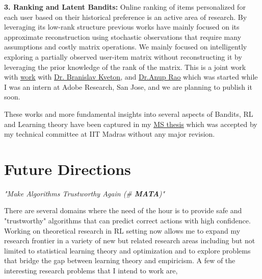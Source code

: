 \documentclass{article}
\begin{document}
\textbf{3. Ranking and Latent Bandits:} Online ranking of items personalized for each user based on their historical preference is an active area of research. By leveraging its low-rank structure previous works have mainly focused on its approximate reconstruction using stochastic observations that require many assumptions and costly matrix operations. We mainly focused on intelligently exploring a partially observed user-item matrix without reconstructing it by leveraging the prior knowledge of the rank of the matrix. This is a joint work with  \href{https://subhojyoti.github.io/pdf/paper.pdf}{\underline{\color{blue} work}} with \href{http://www.bkveton.com/}{\underline{\color{red}Dr. Branislav Kveton}}, and \href{https://sites.google.com/site/anupraob/}{\underline{\color{red}Dr.Anup Rao}} which was started while I was an intern at Adobe Research, San Jose, and we are planning to publish it soon.

These works and more fundamental insights into several aspects of Bandits, RL and Learning theory have been captured in my \href{https://www.cse.iitm.ac.in/~ravi/papers/Subhojyoti_thesis.pdf}{\underline{\color{blue}MS thesis}} which was accepted by my technical committee at IIT Madras without any major revision.
     
     
    
\vspace*{-2em}
\section{Future Directions}
\vspace*{-1em}

\begin{center} \textit{"Make Algorithms Trustworthy Again (\# \textbf{MATA})"}\end{center}

\vspace*{-0.8em}
There are several domains where the need of the hour is to provide safe and "trustworthy" algorithms that can predict correct actions with high confidence. Working on theoretical research in RL setting now allows me to expand my research frontier in a variety of new but related research areas including but not limited to statistical learning theory and optimization and to explore problems that bridge the gap between learning theory and empiricism. A few of the interesting research problems
that I intend to work are,
\end{document}
